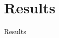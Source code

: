 
\section{Results}



    \begin{frame}[plain]{}

        \begin{center}

        \huge Results

        \end{center}

    \end{frame}


